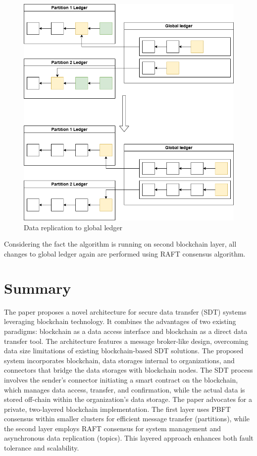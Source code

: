 \documentclass[10pt]{llncs}
\begin{document}
\begin{figure}
    \includegraphics[width=\textwidth]{global-and-local-ledgers.png}
    \caption{Data replication to global ledger} \label{global-and-local-ledgers}
\end{figure}

Considering the fact the algorithm is running on second blockchain layer, all changes to global ledger again are performed using RAFT consensus algorithm.

\section{Summary} \label{summary}

The paper proposes a novel architecture for secure data transfer (SDT) systems leveraging blockchain technology.
It combines the advantages of two existing paradigms: blockchain as a data access interface and blockchain as a direct data transfer tool.
The architecture features a message broker-like design, overcoming data size limitations of existing blockchain-based SDT solutions.
The proposed system incorporates blockchain, data storages internal to organizations, and connectors that bridge the data storages with blockchain nodes.
The SDT process involves the sender's connector initiating a smart contract on the blockchain, which manages data access, transfer, and confirmation, while the actual data is stored off-chain within the organization's data storage. The paper advocates for a private, two-layered blockchain implementation.
The first layer uses PBFT consensus within smaller clusters for efficient message transfer (partitions), while the second layer employs RAFT consensus for system management and asynchronous data replication (topics).
This layered approach enhances both fault tolerance and scalability.
\end{document}

